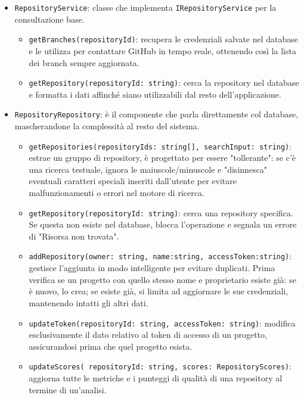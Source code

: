 \documentclass[a4paper, 11pt]{article}
\begin{document}
\begin{itemize}
\begin{itemize}
      \item \texttt{RepositoryService}: classe che implementa \texttt{IRepositoryService} per la consultazione base.
        \begin{itemize}
          \item \texttt{getBranches(repositoryId)}: recupera le credenziali salvate nel database e le utilizza per contattare GitHub in tempo reale, ottenendo così la lista dei branch sempre aggiornata.

          \item \texttt{getRepository(repositoryId: string)}: cerca la repository nel database e formatta i dati affinché siano utilizzabili dal resto dell'applicazione.
        \end{itemize}

      \item \texttt{RepositoryRepository}: è il componente che parla direttamente col database, mascherandone la complessità al resto del sistema.
        \begin{itemize}
          \item \texttt{getRepositories(repositoryIds: string[], searchInput: string)}: estrae un gruppo di repository, è progettato per essere "tollerante": se c'è una ricerca testuale, ignora le maiuscole/minuscole e "disinnesca" eventuali caratteri speciali inseriti dall'utente per evitare malfunzionamenti o errori nel motore di ricerca.

          \item \texttt{getRepository(repositoryId: string)}: cerca una repository specifica. Se questa non esiste nel database, blocca l'operazione e segnala un errore di "Risorsa non trovata".

          \item \texttt{addRepository(owner: string, name:string, accessToken:string)}: gestisce l'aggiunta in modo intelligente per evitare duplicati. Prima verifica se un progetto con quello stesso nome e proprietario esiste già: se è nuovo, lo crea; se esiste già, si limita ad aggiornare le sue credenziali, mantenendo intatti gli altri dati.

          \item \texttt{updateToken(repositoryId: string, accessToken: string)}: modifica esclusivamente il dato relativo al token di accesso di un progetto, assicurandosi prima che quel progetto esista.
          
          \item \texttt{updateScores( repositoryId: string, scores: RepositoryScores)}: aggiorna tutte le metriche e i punteggi di qualità di una repository al termine di un'analisi.
          

\end{itemize}
\end{itemize}
\end{itemize}
\end{document}
